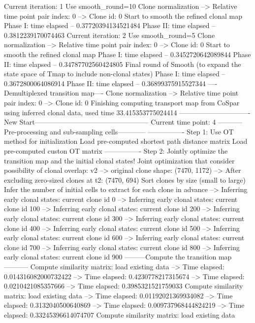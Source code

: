 \documentclass[letterpaper,10pt,english]{sphinxmanual}
\begin{document}
{\begin{sphinxVerbatim}[commandchars=\\\{\}]
Current iteration: 1
Use smooth\_round=10
Clone normalization
--> Relative time point pair index: 0
--> Clone id: 0
Start to smooth the refined clonal map
Phase I: time elapsed --  0.37720394134521484
Phase II: time elapsed --  0.3812239170074463
Current iteration: 2
Use smooth\_round=5
Clone normalization
--> Relative time point pair index: 0
--> Clone id: 0
Start to smooth the refined clonal map
Phase I: time elapsed --  0.3452720642089844
Phase II: time elapsed --  0.34787702560424805
Final round of Smooth (to expand the state space of Tmap to include non-clonal states)
Phase I: time elapsed --  0.3672800064086914
Phase II: time elapsed --  0.36899375915527344
----Demultiplexed transition map----
Clone normalization
--> Relative time point pair index: 0
--> Clone id: 0
Finishing computing transport map from CoSpar using inferred clonal data, used time 33.415353775024414
-------------------------------New Start--------------------------------------------------
Current time point: 4
-----------Pre-processing and sub-sampling cells------------
----------------
Step 1: Use OT method for initialization
Load pre-computed shortest path distance matrix
Load pre-computed custon OT matrix
----------------
Step 2: Jointly optimize the transition map and the initial clonal states!
Joint optimization that consider possibility of clonal overlap: v2
--> original clone shape: (7470, 1172)
--> After excluding zero-sized clones at t2: (7470, 694)
Sort clones by size (small to large)
Infer the number of initial cells to extract for each clone in advance
--> Inferring early clonal states: current clone id 0
--> Inferring early clonal states: current clone id 100
--> Inferring early clonal states: current clone id 200
--> Inferring early clonal states: current clone id 300
--> Inferring early clonal states: current clone id 400
--> Inferring early clonal states: current clone id 500
--> Inferring early clonal states: current clone id 600
--> Inferring early clonal states: current clone id 700
--> Inferring early clonal states: current clone id 800
--> Inferring early clonal states: current clone id 900
---------Compute the transition map-----------
Compute similarity matrix: load existing data
--> Time elapsed:  0.014316082000732422
--> Time elapsed:  0.4230778217315674
--> Time elapsed:  0.0210421085357666
--> Time elapsed:  0.3985321521759033
Compute similarity matrix: load existing data
--> Time elapsed:  0.01192021369934082
--> Time elapsed:  0.3132040500640869
--> Time elapsed:  0.009737968444824219
--> Time elapsed:  0.33245396614074707
Compute similarity matrix: load existing data

\end{sphinxVerbatim}}
\end{document}
